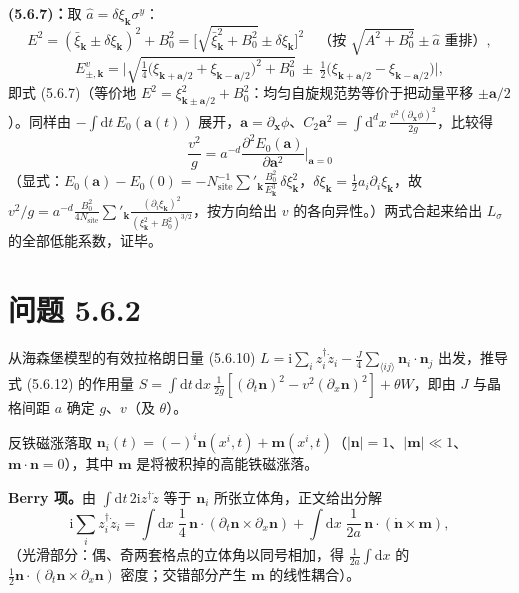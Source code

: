 \textbf{(5.6.7)：}取 $\hat a=\delta\xi_{\pmb k}\sigma^{y}$：
\begin{equation*}
E^{2}=(\bar\xi_{\pmb k}\pm\delta\xi_{\pmb k})^{2}+B_0^{2}
=\Big[\sqrt{\bar\xi_{\pmb k}^{2}+B_0^{2}}\pm\delta\xi_{\pmb k}\Big]^{2}
\quad\text{（按 }\sqrt{A^{2}+B_0^{2}}\pm\hat a\text{ 重排）},
\end{equation*}
\begin{equation*}
E^{v}_{\pm,\pmb k}=\Big|\sqrt{\tfrac14\big(\xi_{\pmb k+\pmb a/2}+\xi_{\pmb k-\pmb a/2}\big)^{2}+B_0^{2}}\ \pm\ \tfrac12\big(\xi_{\pmb k+\pmb a/2}-\xi_{\pmb k-\pmb a/2}\big)\Big| ,
\end{equation*}
即式 (5.6.7)（等价地 $E^{2}=\xi_{\pmb k\pm\pmb a/2}^{2}+B_0^{2}$：均匀自旋规范势等价于把动量平移 $\pm\pmb a/2$）。同样由 $-\int\mathrm{d}t\,E_0(\pmb a(t))$ 展开，$\pmb a=\partial_{\pmb x}\phi$、$C_2\pmb a^{2}=\int\mathrm{d}^{d}x\,\frac{v^{2}(\partial_{\pmb x}\phi)^{2}}{2g}$，比较得
\begin{equation*}
\boxed{\;\frac{v^{2}}{g}=a^{-d}\frac{\partial^{2}E_0(\pmb a)}{\partial\pmb a^{2}}\Big|_{\pmb a=0}\;}
\end{equation*}
（显式：$E_0(\pmb a)-E_0(0)=-N_{\mathrm{site}}^{-1}\sum'_{\pmb k}\frac{B_0^{2}}{E_{\pmb k}^{3}}\,\delta\xi_{\pmb k}^{2}$，$\delta\xi_{\pmb k}=\frac12a_i\partial_i\xi_{\pmb k}$，故 $v^{2}/g=a^{-d}\frac{B_0^{2}}{4N_{\mathrm{site}}}\sum'_{\pmb k}\frac{(\partial_i\xi_{\pmb k})^{2}}{(\xi_{\pmb k}^{2}+B_0^{2})^{3/2}}$，按方向给出 $v$ 的各向异性。）两式合起来给出 $L_\sigma$ 的全部低能系数，证毕。

\section*{问题 5.6.2}
\begin{problem}
从海森堡模型的有效拉格朗日量 (5.6.10) $L=\mathrm{i}\sum_i z_i^{\dagger}\dot z_i-\frac{J}{4}\sum_{\langle ij\rangle}\pmb n_i\cdot\pmb n_j$ 出发，推导式 (5.6.12) 的作用量 $S=\int\mathrm{d}t\,\mathrm{d}x\,\frac{1}{2g}[(\partial_t\pmb n)^{2}-v^{2}(\partial_x\pmb n)^{2}]+\theta W$，即由 $J$ 与晶格间距 $a$ 确定 $g$、$v$（及 $\theta$）。
\end{problem}
\solution

反铁磁涨落取 $\pmb n_i(t)=(-)^{i}\pmb n(x^i,t)+\pmb m(x^i,t)$（$|\pmb n|=1$、$|\pmb m|\ll1$、$\pmb m\cdot\pmb n=0$），其中 $\pmb m$ 是将被积掉的高能铁磁涨落。

\textbf{Berry 项。}由 $\int\mathrm{d}t\,2\mathrm{i}z^{\dagger}\dot z$ 等于 $\pmb n_i$ 所张立体角，正文给出分解
\begin{equation*}
\mathrm{i}\sum_i z_i^{\dagger}\dot z_i
=\int\mathrm{d}x\;\frac14\,\pmb n\cdot(\partial_t\pmb n\times\partial_x\pmb n)
+\int\mathrm{d}x\;\frac{1}{2a}\,\pmb n\cdot(\dot{\pmb n}\times\pmb m) ,
\end{equation*}
（光滑部分：偶、奇两套格点的立体角以同号相加，得 $\frac{1}{2a}\int\mathrm{d}x$ 的 $\frac{1}{2}\pmb n\cdot(\partial_t\pmb n\times\partial_x\pmb n)$ 密度；交错部分产生 $\pmb m$ 的线性耦合）。

